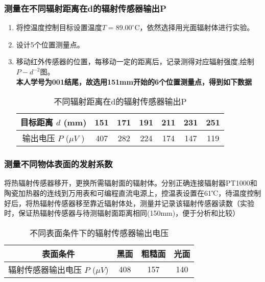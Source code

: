 \documentclass[dvipsnames, svgnames,a4paper,11pt]{article}
\begin{document}
	\subsubsection{测量在不同辐射距离在d的辐射传感器输出P }
\begin{enumerate}
	\item 将控温度控制目标设置温度$T=89.00^\circ$C，依然选择用光面辐射体进行实验。

\item 设计5个位置测量点。

\item 移动红外传感器的位置，每移动一定的距离后，记录测得对应辐射强度,绘制$P-d^{-2}$图。\\
\textbf{ 本人学号为001结尾，故选用151mm开始的6个位置测量点，得到如下数据}
\begin{table}[htbp]
	\centering
	\caption{不同辐射距离在d的辐射传感器输出P}
	  \begin{tabular}{|c|cccccc|}
		\hline
	  目标距离 $d$ (mm) & 151 & 171 & 191 & 211 & 231&251 \\
	  \hline
	  输出电压 $P$ ($\mu V$ ) & 407 & 282 & 224& 174 & 147&119 \\
	  \hline
	  \end{tabular}%
	\label{tab:data_horizontal}%
  \end{table}%
\end{enumerate}
\subsubsection{测量不同物体表面的发射系数}
将热辐射传感器移开，更换所需辐射面的辐射体。分别正确连接辐射器PT1000和陶瓷加热器的连线到万用表和可编程直流电源上，控温表设置在61℃，待温度控制好后，将热辐射传感器移至靠近辐射体处，测量并记录该辐射传感器读数（实验时，保证热辐射传感器与待测辐射面距离相同(150mm)，便于分析和比较）
\begin{table}[H]
	\centering
	\caption{不同表面条件下的辐射传感器输出电压}
	  \begin{tabular}{|c|c|c|c|}
		\hline
	  表面条件 & 黑面 & 粗糙面 & 光面 \\
	  \hline
	  辐射传感器输出电压 $P$ ($\mu V$) & 408 & 157 & 140 \\
	  \hline
	  \end{tabular}%
	\label{tab:data_horizontal}%
  \end{table}%
\end{document}
